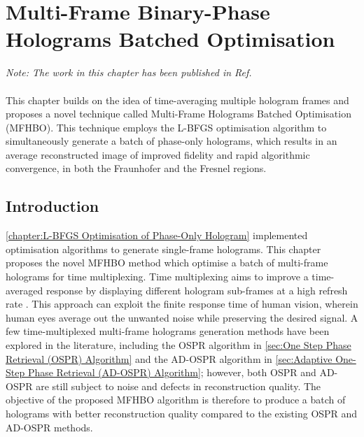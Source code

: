 \chapter{Multi-Frame Binary-Phase Holograms Batched Optimisation}
\label{chapter:Multi Frame Holograms Batched Optimisation}

\graphicspath{{Chapter_MFHBO/Figs/}}

\textit{Note: The work in this chapter has been published in Ref. \cite{Sha2024MFHBO}}\\\\

This chapter builds on the idea of time-averaging multiple hologram frames and proposes a novel technique called Multi-Frame Holograms Batched Optimisation (MFHBO). This technique employs the L-BFGS optimisation algorithm to simultaneously generate a batch of phase-only holograms, which results in an average reconstructed image of improved fidelity and rapid algorithmic convergence, in both the Fraunhofer and the Fresnel regions.

\section{Introduction}
	\cref{chapter:L-BFGS Optimisation of Phase-Only Hologram} implemented optimisation algorithms to generate single-frame holograms. This chapter proposes the novel MFHBO method which optimise a batch of multi-frame holograms for time multiplexing. Time multiplexing aims to improve a time-averaged response by displaying different hologram sub-frames at a high refresh rate \cite{Amako1995}. This approach can exploit the finite response time of human vision, wherein human eyes average out the unwanted noise while preserving the desired signal. A few time-multiplexed multi-frame holograms generation methods have been explored in the literature, including the OSPR algorithm in \cref{sec:One Step Phase Retrieval (OSPR) Algorithm} and the AD-OSPR algorithm in \cref{sec:Adaptive One-Step Phase Retrieval (AD-OSPR) Algorithm}; however, both OSPR and AD-OSPR are still subject to noise and defects in reconstruction quality. The objective of the proposed MFHBO algorithm is therefore to produce a batch of holograms with better reconstruction quality compared to the existing OSPR and AD-OSPR methods.


